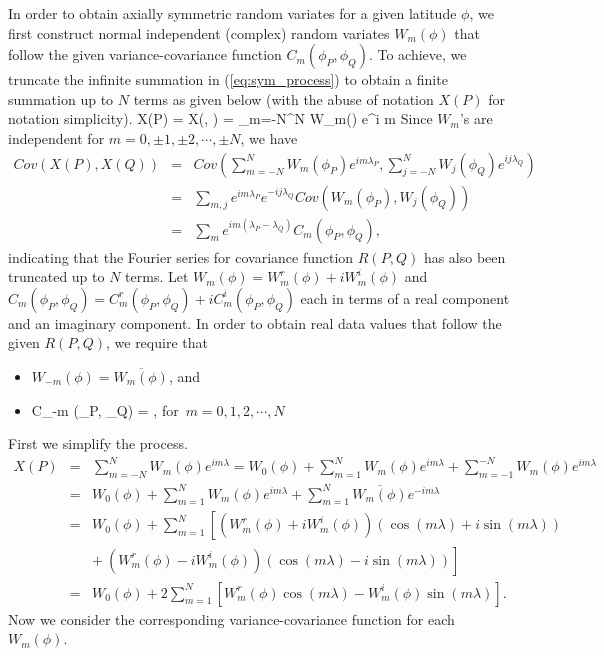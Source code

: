 In order to obtain axially symmetric random variates for a given latitude $\phi$, we first construct normal independent (complex) random variates $W_m(\phi)$ that follow the given  variance-covariance function $C_m(\phi_P, \phi_Q)$. To achieve, we truncate the infinite summation in (\ref{eq:sym_process}) to obtain a finite summation up to $N$ terms as given below (with the abuse of notation $X(P)$ for notation simplicity).
	\beq
	X(P) = X(\phi, \lambda) = \sum_{m=-N}^{N} W_m(\phi) e^{i m \lambda}
	\eeq
Since $W_m$'s are independent for $m =0, \pm 1, \pm 2, \cdots, \pm N$, we have			
	\begin{eqnarray*}
		Cov(X(P), {X(Q)}) &=& Cov\left(\sum_{m = -N}^{N} W_m(\phi_P) e^{i m \lambda_P}, \sum_{j=-N}^{N} {W_j(\phi_Q)} e^{i j \lambda_Q}\right) \\
		&=& \sum_{m, j} e^{i m \lambda_P} e^{-i j \lambda_Q} Cov(W_m(\phi_P), {W_j(\phi_Q)}) \\
		&=& \sum_{m} e^{im (\lambda_P - \lambda_Q)} C_m(\phi_P, \phi_Q),
	\end{eqnarray*}
indicating that the Fourier series for covariance function $R(P, Q)$ has also been truncated up to $N$ terms. Let $W_m(\phi) = W_{m}^{r}(\phi) + i W_{m}^i(\phi)$ and $C_m(\phi_P, \phi_Q) = C_m^r(\phi_P, \phi_Q) + i C_m^i(\phi_P, \phi_Q)$ each in terms of a real component and an imaginary component. In order to obtain real data values that follow the given $R(P, Q)$, we require that
\begin{itemize}
\item $W_{-m}(\phi) = \overline{W_m(\phi)}$, and
\item \beq \label{eq:for_real}
	C_{-m} (\phi_P, \phi_Q) = , \quad \mbox{for $m = 0, 1, 2, \cdots, N$}
	\eeq
\end{itemize}
First we simplify the process.
	\begin{eqnarray} \label{eq:finite_process}
		X(P) &=& \sum_{m = -N}^N W_m(\phi) e^{im \lambda} =  W_0(\phi) + \sum_{m =1}^N W_m(\phi) e^{im \lambda} + \sum_{m =-1}^{-N} W_m(\phi) e^{im \lambda} \nonumber \\
		&=& W_0(\phi) + \sum_{m =1}^N W_m(\phi) e^{im \lambda} + \sum_{m =1}^{N} \overline{W_m(\phi)} e^{-im \lambda} \nonumber \\
		&=& W_0(\phi) + \sum_{m =1}^N \left[  (W_m^r(\phi)+iW_m^i(\phi))(\cos(m \lambda) + i \sin(m \lambda)) \right. \nonumber \\
		& & \left. +\ (W_m^r(\phi)-iW_m^i(\phi))(\cos(m \lambda) - i \sin(m \lambda))  \right]  \nonumber \\
		&=& W_0(\phi) + 2 \sum_{m =1}^N \left[W_m^r(\phi)\cos(m\lambda) - W_m^i(\phi)\sin(m \lambda)\right].
	\end{eqnarray}
Now we consider the corresponding variance-covariance function for each $W_m(\phi)$.   			
 
